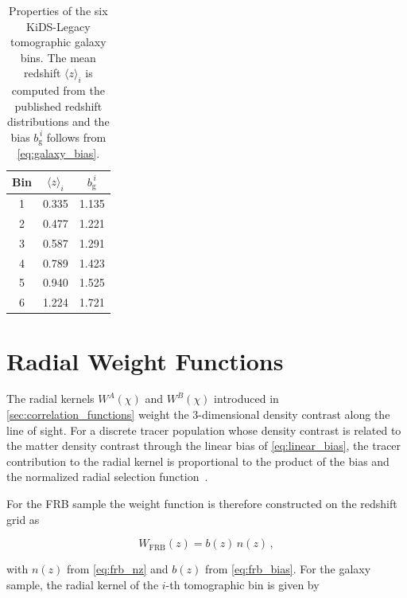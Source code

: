\begin{table}[H]
    \centering
    \caption{Properties of the six KiDS-Legacy tomographic galaxy bins. The mean redshift
    $\langle z \rangle_i$ is computed from the published redshift distributions and the bias
    $b_{\mathrm{g}}^{\,i}$ follows from \autoref{eq:galaxy_bias}.}
    \label{tab:galaxy_bins}
    \begin{tabular}{
        S[table-format=1]
        @{\hspace{1.2em}}
        S[table-format=1.3]
        @{\hspace{1.0em}}
        S[table-format=1.3]
        }
        \toprule
        Bin & {$\langle z \rangle_i$} & {$b_{\mathrm{g}}^{\,i}$} \\
         & 0.335 & 1.135 \\
        2 & 0.477 & 1.221 \\
        3 & 0.587 & 1.291 \\
        4 & 0.789 & 1.423 \\
        5 & 0.940 & 1.525 \\
        6 & 1.224 & 1.721 \\
        \bottomrule
    \end{tabular}
\end{table}

\section{Radial Weight Functions} \label{sec:weight_functions}
The radial kernels $W^A(\chi)$ and $W^B(\chi)$ introduced in \autoref{sec:correlation_functions} weight the
3-dimensional density contrast along the line of sight. For a discrete tracer population whose 
density contrast is related to the matter density contrast through the linear bias of \autoref{eq:linear_bias}, the tracer 
contribution to the radial kernel is proportional to the product of the bias and the normalized radial 
selection function~\cite{Khosravi_2016}.

For the FRB sample the weight function is therefore constructed on the redshift grid as

\begin{equation}\label{eq:weight_frb}
    W_{\mathrm{FRB}}(z) = b(z) \, n(z) \,,
\end{equation}

with $n(z)$ from \autoref{eq:frb_nz} and $b(z)$ from \autoref{eq:frb_bias}. 
For the galaxy sample, the radial kernel of the $i$-th tomographic bin is given by

